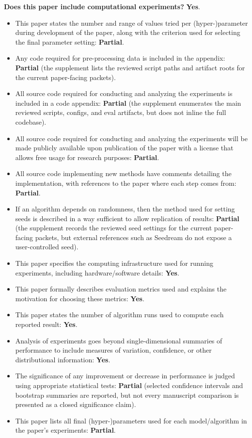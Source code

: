 \documentclass[letterpaper]{article}
\begin{document}
\noindent\textbf{Does this paper include computational experiments?} \textbf{Yes}.
\begin{itemize}
\item This paper states the number and range of values tried per (hyper-)parameter during development of the paper, along with the criterion used for selecting the final parameter setting: \textbf{Partial}.
\item Any code required for pre-processing data is included in the appendix: \textbf{Partial} (the supplement lists the reviewed script paths and artifact roots for the current paper-facing packets).
\item All source code required for conducting and analyzing the experiments is included in a code appendix: \textbf{Partial} (the supplement enumerates the main reviewed scripts, configs, and eval artifacts, but does not inline the full codebase).
\item All source code required for conducting and analyzing the experiments will be made publicly available upon publication of the paper with a license that allows free usage for research purposes: \textbf{Partial}.
\item All source code implementing new methods have comments detailing the implementation, with references to the paper where each step comes from: \textbf{Partial}.
\item If an algorithm depends on randomness, then the method used for setting seeds is described in a way sufficient to allow replication of results: \textbf{Partial} (the supplement records the reviewed seed settings for the current paper-facing packets, but external references such as Seedream do not expose a user-controlled seed).
\item This paper specifies the computing infrastructure used for running experiments, including hardware/software details: \textbf{Yes}.
\item This paper formally describes evaluation metrics used and explains the motivation for choosing these metrics: \textbf{Yes}.
\item This paper states the number of algorithm runs used to compute each reported result: \textbf{Yes}.
\item Analysis of experiments goes beyond single-dimensional summaries of performance to include measures of variation, confidence, or other distributional information: \textbf{Yes}.
\item The significance of any improvement or decrease in performance is judged using appropriate statistical tests: \textbf{Partial} (selected confidence intervals and bootstrap summaries are reported, but not every manuscript comparison is presented as a closed significance claim).
\item This paper lists all final (hyper-)parameters used for each model/algorithm in the paper's experiments: \textbf{Partial}.
\end{itemize}
\end{document}

